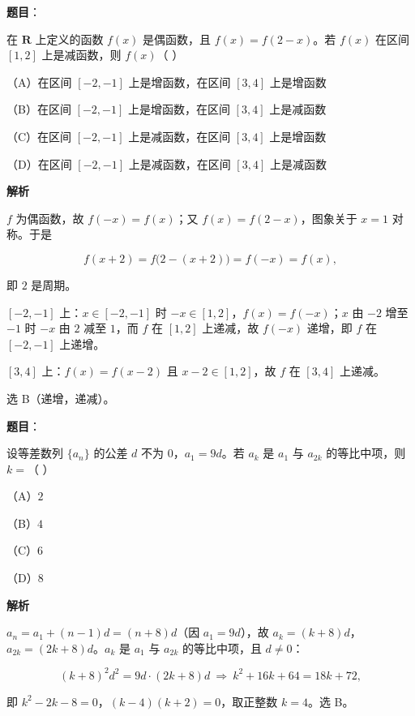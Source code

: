 \begin{answer}

\textbf{题目}：

在 $\mathbf{R}$ 上定义的函数 $f(x)$ 是偶函数，且 $f(x)=f(2-x)$。若 $f(x)$ 在区间 $[1,2]$ 上是减函数，则 $f(x)$（ ）

（A）在区间 $[-2,-1]$ 上是增函数，在区间 $[3,4]$ 上是增函数

（B）在区间 $[-2,-1]$ 上是增函数，在区间 $[3,4]$ 上是减函数

（C）在区间 $[-2,-1]$ 上是减函数，在区间 $[3,4]$ 上是增函数

（D）在区间 $[-2,-1]$ 上是减函数，在区间 $[3,4]$ 上是减函数

\textbf{解析}

$f$ 为偶函数，故 $f(-x)=f(x)$；又 $f(x)=f(2-x)$，图象关于 $x=1$ 对称。于是

\nopagebreak[4]
\[f(x+2)=f\bigl(2-(x+2)\bigr)=f(-x)=f(x),\]

即 $2$ 是周期。

$[-2,-1]$ 上：$x\in[-2,-1]$ 时 $-x\in[1,2]$，$f(x)=f(-x)$；$x$ 由 $-2$ 增至 $-1$ 时 $-x$ 由 $2$ 减至 $1$，而 $f$ 在 $[1,2]$ 上递减，故 $f(-x)$ 递增，即 $f$ 在 $[-2,-1]$ 上递增。

$[3,4]$ 上：$f(x)=f(x-2)$ 且 $x-2\in[1,2]$，故 $f$ 在 $[3,4]$ 上递减。

选 B（递增，递减）。


\end{answer}
\begin{answer}

\textbf{题目}：

设等差数列 $\{a_n\}$ 的公差 $d$ 不为 $0$，$a_1=9d$。若 $a_k$ 是 $a_1$ 与 $a_{2k}$ 的等比中项，则 $k=$（ ）

（A）$2$

（B）$4$

（C）$6$

（D）$8$

\textbf{解析}

$a_n=a_1+(n-1)d=(n+8)d$（因 $a_1=9d$），故 $a_k=(k+8)d$，$a_{2k}=(2k+8)d$。$a_k$ 是 $a_1$ 与 $a_{2k}$ 的等比中项，且 $d\ne0$：

\nopagebreak[4]
\[(k+8)^2d^2=9d\cdot(2k+8)d\ \Longrightarrow\ k^2+16k+64=18k+72,\]

即 $k^2-2k-8=0$，$(k-4)(k+2)=0$，取正整数 $k=4$。选 B。


\end{answer}
